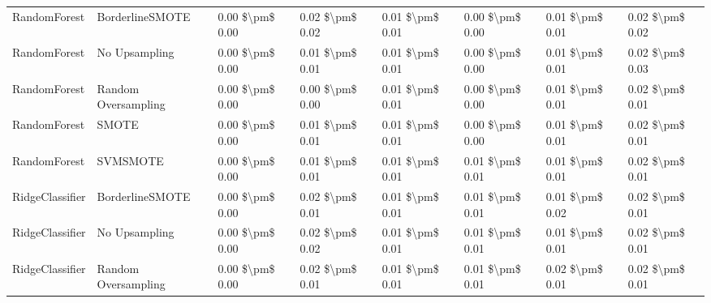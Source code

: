 \begin{tabular}{llllllll}
                   RandomForest &               BorderlineSMOTE & 0.00 \$\textbackslash pm\$ 0.00 &           0.02 \$\textbackslash pm\$ 0.02 &       0.01 \$\textbackslash pm\$ 0.01 &        0.00 \$\textbackslash pm\$ 0.00 &                         0.01 \$\textbackslash pm\$ 0.01 &     0.02 \$\textbackslash pm\$ 0.02 \\
                   RandomForest &                 No Upsampling & 0.00 \$\textbackslash pm\$ 0.00 &           0.01 \$\textbackslash pm\$ 0.01 &       0.01 \$\textbackslash pm\$ 0.01 &        0.00 \$\textbackslash pm\$ 0.00 &                         0.01 \$\textbackslash pm\$ 0.01 &     0.02 \$\textbackslash pm\$ 0.03 \\
                   RandomForest &           Random Oversampling & 0.00 \$\textbackslash pm\$ 0.00 &           0.00 \$\textbackslash pm\$ 0.00 &       0.01 \$\textbackslash pm\$ 0.01 &        0.00 \$\textbackslash pm\$ 0.00 &                         0.01 \$\textbackslash pm\$ 0.01 &     0.02 \$\textbackslash pm\$ 0.01 \\
                   RandomForest &                         SMOTE & 0.00 \$\textbackslash pm\$ 0.00 &           0.01 \$\textbackslash pm\$ 0.01 &       0.01 \$\textbackslash pm\$ 0.01 &        0.00 \$\textbackslash pm\$ 0.00 &                         0.01 \$\textbackslash pm\$ 0.01 &     0.02 \$\textbackslash pm\$ 0.01 \\
                   RandomForest &                      SVMSMOTE & 0.00 \$\textbackslash pm\$ 0.00 &           0.01 \$\textbackslash pm\$ 0.01 &       0.01 \$\textbackslash pm\$ 0.01 &        0.01 \$\textbackslash pm\$ 0.01 &                         0.01 \$\textbackslash pm\$ 0.01 &     0.02 \$\textbackslash pm\$ 0.01 \\
                RidgeClassifier &               BorderlineSMOTE & 0.00 \$\textbackslash pm\$ 0.00 &           0.02 \$\textbackslash pm\$ 0.01 &       0.01 \$\textbackslash pm\$ 0.01 &        0.01 \$\textbackslash pm\$ 0.01 &                         0.01 \$\textbackslash pm\$ 0.02 &     0.02 \$\textbackslash pm\$ 0.01 \\
                RidgeClassifier &                 No Upsampling & 0.00 \$\textbackslash pm\$ 0.00 &           0.02 \$\textbackslash pm\$ 0.02 &       0.01 \$\textbackslash pm\$ 0.01 &        0.01 \$\textbackslash pm\$ 0.01 &                         0.01 \$\textbackslash pm\$ 0.01 &     0.02 \$\textbackslash pm\$ 0.01 \\
                RidgeClassifier &           Random Oversampling & 0.00 \$\textbackslash pm\$ 0.00 &           0.02 \$\textbackslash pm\$ 0.01 &       0.01 \$\textbackslash pm\$ 0.01 &        0.01 \$\textbackslash pm\$ 0.01 &                         0.02 \$\textbackslash pm\$ 0.01 &     0.02 \$\textbackslash pm\$ 0.01 \\

\end{tabular}
